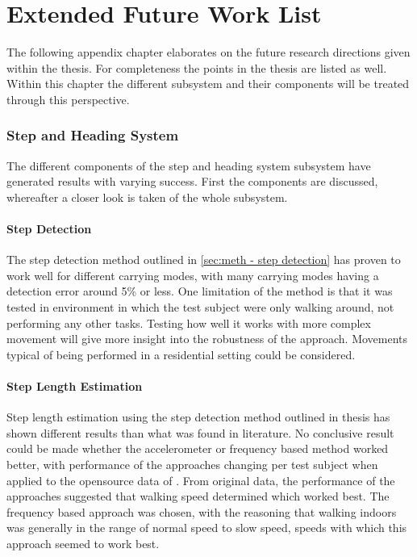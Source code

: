 \chapter{Extended Future Work List}
\label{chap:app-extended_future_work}
The following appendix chapter elaborates on the future research directions given within the thesis. For completeness the points in the thesis are listed as well. Within this chapter the different subsystem and their components will be treated through this perspective.

\subsection{Step and Heading System }

The different components of the step and heading system subsystem have generated results with varying success. First the components are discussed, whereafter a closer look is taken of the whole subsystem.

\subsubsection*{Step Detection}

The step detection method outlined in \cref{sec:meth - step detection} has proven to work well for different carrying modes, with many carrying modes having a detection error around 5\% or less. One limitation of the method is that it was tested in environment in which the test subject were only walking around, not performing any other tasks. Testing how well it works with more complex movement will give more insight into the robustness of the approach. Movements typical of being performed in a residential setting could be considered.

\subsubsection*{Step Length Estimation}

Step length estimation using the step detection method outlined in thesis has shown different results than what was found in literature. No conclusive result could be made whether the accelerometer or frequency based method worked better, with performance of the approaches changing per test subject when applied to the opensource data of \citet{Vezocnik2019}. From original data, the performance of the approaches suggested that walking speed determined which worked best. The frequency based approach was chosen, with the reasoning that walking indoors was generally in the range of normal speed to slow speed, speeds with which this approach seemed to work best. \par 

